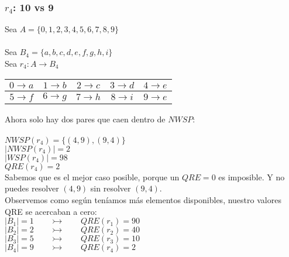 	\subsubsection{$r_{4}$: 10 vs 9}
	
	\noindent
	Sea $A=\{0,1,2,3,4,5,6,7,8,9\}$\\\\
	Sea $B_{4} = \{a,b,c,d,e,f,g,h,i\}$
	\\
	
	\noindent
	Sea $r_{4}:A \longrightarrow B_{4}$
	\begin{table}[h!]
		\begin{tabular}{|c|c|c|c|c|}
			\hline
			$0 \longrightarrow a$ & $1 \longrightarrow b$ & $2 \longrightarrow c$ & $3 \longrightarrow d$ & $4 \longrightarrow e$ \\ 
			\hline
			$5 \longrightarrow f$ & $6 \longrightarrow g$ & $7 \longrightarrow h$ & $8 \longrightarrow i$ & $9 \longrightarrow e$ \\  
			\hline
		\end{tabular}
	\end{table}
	
	\noindent
	Ahora solo hay dos pares que caen dentro de $NWSP$: \\\\
	$NWSP(r_{4})=\{ (4,9), (9,4) \}$\\
	$|NWSP(r_{4})| = 2$\\
	$|WSP(r_{4})| = 98$\\
	$QRE(r_{4})=2$
	\\
	
	\noindent
	Sabemos que es el mejor caso posible, porque un $QRE=0$ es imposible. Y no puedes resolver $(4,9)$ sin resolver $(9,4)$.
	\\
	
	\noindent
	Observemos como según teníamos más elementos disponibles, nuestro valores QRE se acercaban a cero:\\
	$ |B_{1}| = 1 \:\:\:\:\:\:\:\:\: \rightarrowtail \:\:\:\:\:\:\:\:\: QRE(r_{1}) = 90$\\
	$ |B_{2}| = 2 \:\:\:\:\:\:\:\:\: \rightarrowtail \:\:\:\:\:\:\:\:\: QRE(r_{2}) = 40$\\
	$ |B_{3}| = 5 \:\:\:\:\:\:\:\:\: \rightarrowtail \:\:\:\:\:\:\:\:\: QRE(r_{3}) = 10$\\
	$ |B_{4}| = 9 \:\:\:\:\:\:\:\:\: \rightarrowtail \:\:\:\:\:\:\:\:\: QRE(r_{4}) = 2$\\
	
	\newpage
	
